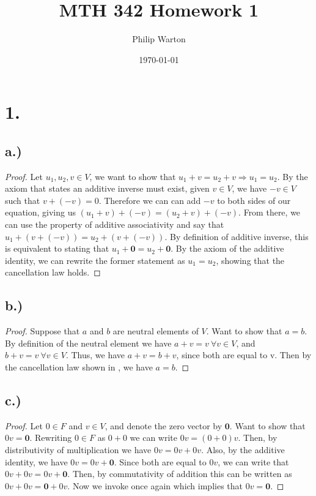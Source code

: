 \documentclass{article}
\begin{document}
\title{MTH 342 Homework 1}
\author{Philip Warton}
\date{\today}
\maketitle

\section*{1.}
\subsection*{a.)}

\begin{proof}
Let $u_1, u_2, v \in V$, we want to show that $u_1 + v = u_2 + v \Rightarrow u_1 = u_2$. 
By the axiom that states an additive inverse must exist, given $v \in V$, we have $-v \in V$ such that $v + (-v) = 0$. Therefore we can can add $-v$ to both sides of our equation, giving us $(u_1 + v) + (-v) = (u_2 + v) + (-v)$. From there, we can use the property of additive associativity and say that $u_1 + (v + (-v)) = u_2 + (v + (-v))$. By definition of additive inverse, this is equivalent to stating that $u_1 + \mathbf{0} = u_2 + \mathbf{0}$. By the axiom of the additive identity, we can rewrite the former statement as $u_1 = u_2$, showing that the cancellation law holds.

\end{proof}

\subsection*{b.)}

\begin{proof}
Suppose that $a$ and $b$ are neutral elements of $V$. Want to show that $a = b$. By definition of the neutral element we have $a + v = v \ \forall v \in V$, and $b + v = v \ \forall v \in V$. Thus, we have $a + v = b + v$, since both are equal to v. Then by the cancellation law shown in , we have $a = b$.

\end{proof}

\subsection*{c.)}

\begin{proof}
Let $0 \in F$ and $v \in V$, and denote the zero vector by $\mathbf{0}$. Want to show that $0v = \mathbf{0}$. Rewriting $0 \in F$ as $0 + 0$ we can write $0v = (0 + 0)v$. Then, by distributivity of multiplication we have $0v = 0v + 0v$. Also, by the additive identity, we have $0v = 0v + \mathbf{0}$. Since both are equal to $0v$, we can write that $0v + 0v = 0v + \mathbf{0}$. Then, by commutativity of addition this can be written as $0v + 0v = \mathbf{0} + 0v$. Now we invoke  once again which implies that $0v = \mathbf{0}$.

\end{proof}
\end{document}
